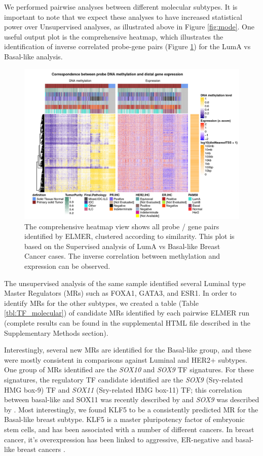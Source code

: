 We performed pairwise analyses between different molecular subtypes. It is important to note that we expect these analyses to have increased statistical power over Unsupervised analyses, as illustrated above in Figure \ref{fig:mode}. One useful output plot is the comprehensive heatmap,
which illustrates the identification of inverse correlated probe-gene pairs (Figure \ref{fig:heatmap}) for the LumA vs Basal-like analysis.

\begin{figure}[ht!]
\centering
\includegraphics[width=1.0\textwidth]{images/heatmap.jpg}
\caption[Heatmap of inverse correlated probe and gene pairs ]{\label{fig:heatmap} The comprehensive heatmap view shows all probe / gene pairs identified by ELMER, clustered according to similarity. This plot is based on the Supervised analysis of LumA vs Basal-like Breast Cancer cases. The inverse correlation between methylation and expression can be observed.}
\end{figure}

The unsupervised analysis of the same sample identified several Luminal type Master Regulators (MRs) such as FOXA1, GATA3, and ESR1. In order to identify MRs for the other subtypes, we created a table  (Table \ref{tbl:TF_molecular}) of candidate MRs identified by each pairwise ELMER run (complete results can be found in the supplemental HTML file described in the Supplementary Methods section).

Interestingly, several new MRs are identified for the Basal-like group, and these were mostly consistent in comparisons against Luminal and HER2+ subtypes. One group of MRs identified are the \textit{SOX10} and \textit{SOX9} TF signatures. For these signatures, the regulatory TF candidate identified are the \textit{SOX9} (Sry-related HMG box-9) TF and \textit{SOX11} (Sry-related HMG box-11) TF; this correlation between basal-like and SOX11 was recently described by \cite{shepherd2016sox11} and \textit{SOX9} was described by \cite{gong2015foxa1}. Most interestingly, we found KLF5 to be a consistently predicted MR for the Basal-like breast subtype. KLF5 is a master pluripotency factor of embryonic stem cells, and has been associated with a number of different cancers. In breast cancer, it's overexpression has been linked to aggressive, ER-negative and basal-like breast cancers \cite{ben2008embryonic}. %

